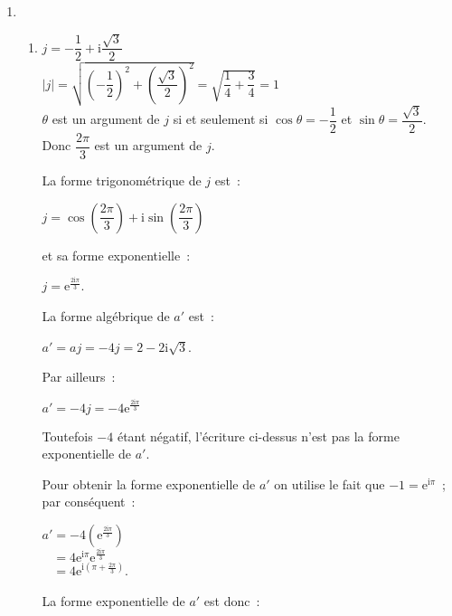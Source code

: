 \begin{corrige}
     \begin{enumerate}
          \item
          \begin{enumerate}[label=\alph*.]
               \item
               $j=-\dfrac{1}{2} + \text{i}\dfrac{\sqrt{3}}{2}$\\
               $\left| j \right| = \sqrt{\left(-\dfrac{1}{2}\right)^2+\left(\dfrac{\sqrt{3}}{2}\right)^2} = \sqrt{\dfrac{1}{4}+\dfrac{3}{4}}=1$\\
               $\theta$ est un argument de $j$ si et seulement si $\cos \theta = -\dfrac{1}{2}$ et $\sin \theta = \dfrac{\sqrt{3}}{2}$. Donc $\dfrac{2\pi}{3}$ est un argument de $j$.
               \par
               La forme trigonométrique de $j$ est~:
               \par
               $j=\cos\left(\dfrac{2\pi}{3}\right) + \text{i}\sin\left(\dfrac{2\pi}{3}\right)$
               \par
               et sa forme exponentielle~:
               \par
               $j= \text{e}^{\frac{2\text{i}\pi}{3}}$.
               \par
               La forme algébrique de $a'$ est~:
               \par
               $a'=aj=-4j=2-2\text{i}\sqrt{3}$.
               \par
               Par ailleurs~:
               \par
               $a'=-4j= -4\text{e}^{\frac{2\text{i}\pi}{3}}$
               \par
               Toutefois $-4$ étant négatif, l'écriture ci-dessus n'est pas la forme exponentielle de $a'$.
               \par
               Pour obtenir la forme exponentielle de $a'$ on utilise le fait que $-1=\text{e}^{\text{i}\pi}$~; par conséquent~:
               \par
               $a'=-4\left( \text{e}^{\frac{2\text{i}\pi}{3}}\right)$\\
               $\phantom{a'}=4 \text{e}^{\text{i}\pi}\text{e}^{\frac{2\text{i}\pi}{3}}$\\
               $\phantom{a'}=4\text{e}^{\text{i}\left( \pi+\frac{2\pi}{3}\right)  }$.
               \par
               La forme exponentielle de $a'$ est donc~:
               \par

\end{enumerate}
\end{enumerate}
\end{corrige}
